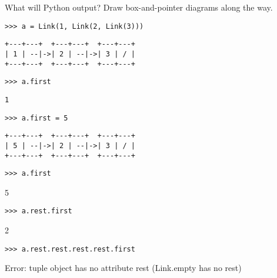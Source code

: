 \begin{blocksection}
\question What will Python output? Draw box-and-pointer diagrams along the way.

\begin{lstlisting}
>>> a = Link(1, Link(2, Link(3)))
\end{lstlisting}
\begin{solution}[0in]
\begin{lstlisting}
+---+---+  +---+---+  +---+---+
| 1 | --|->| 2 | --|->| 3 | / |
+---+---+  +---+---+  +---+---+
\end{lstlisting}
\end{solution}

\begin{lstlisting}
>>> a.first
\end{lstlisting}
\begin{solution}[.5in]
\begin{lstlisting}
1
\end{lstlisting}
\end{solution}
\begin{lstlisting}
>>> a.first = 5
\end{lstlisting}
\begin{solution}[0in]
\begin{lstlisting}
+---+---+  +---+---+  +---+---+
| 5 | --|->| 2 | --|->| 3 | / |
+---+---+  +---+---+  +---+---+
\end{lstlisting}
\end{solution}

\begin{lstlisting}
>>> a.first
\end{lstlisting}
\begin{solution}[.5in]
5
\end{solution}

\begin{lstlisting}
>>> a.rest.first
\end{lstlisting}
\begin{solution}[.25in]
2
\end{solution}

\begin{lstlisting}
>>> a.rest.rest.rest.rest.first
\end{lstlisting}
\begin{solution}[.25in]
Error: tuple object has no attribute rest (Link.empty has no rest)
\end{solution}
\end{blocksection}

